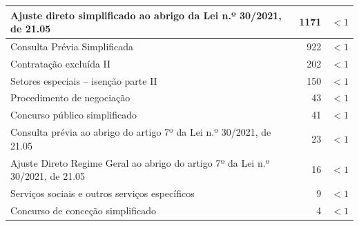 \begin{table}[H]
{\begin{tabular}{lrr}
			\rowcolor[HTML]{EFEFEF} 
			Ajuste direto simplificado ao abrigo da Lei n.º 30/2021, de 21.05              & 1171                                                                     & $< 1$                                                           \\ \hline
			Consulta Prévia Simplificada                                                   & 922                                                                      & $< 1$                                                            \\ \hline
			\rowcolor[HTML]{EFEFEF} 
			Contratação excluída II                                                        & 202                                                                      & $< 1$                                                            \\ \hline
			Setores especiais – isenção parte II                                           & 150                                                                      & $< 1$                                                          \\ \hline
			\rowcolor[HTML]{EFEFEF} 
			Procedimento de negociação                                                     & 43                                                                       & $< 1$                                                          \\ \hline
			Concurso público simplificado                                                  & 41                                                                       & $< 1$                                                          \\ \hline
			\rowcolor[HTML]{EFEFEF} 
			Consulta prévia ao abrigo do artigo 7º da Lei n.º 30/2021, de 21.05            & 23                                                                       & $< 1$                                                          \\ \hline
			Ajuste Direto Regime Geral ao abrigo do artigo 7º da Lei n.º 30/2021, de 21.05 & 16                                                                       & $< 1$                                                          \\ \hline
			\rowcolor[HTML]{EFEFEF} 
			Serviços sociais e outros serviços específicos                                 & 9                                                                        & $< 1$                                                          \\ \hline
			Concurso de conceção simplificado                                              & 4                                                                        & $< 1$                                                          \\ \hline

\end{tabular}}
\end{table}
